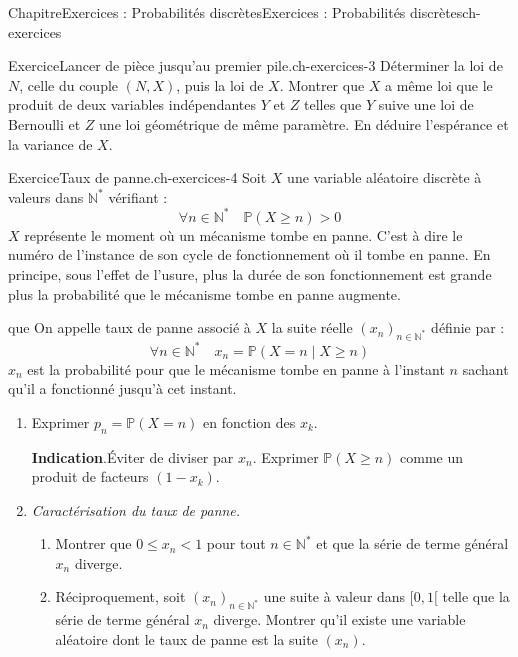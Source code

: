 \documentclass[twoside,10pt,]{book}
\newcommand{\blocktitlefont}{\relax}
\newcommand{\lititle}[1]{{\slshape#1}}
\numberwithin{equation}{chapter}
\newcommand{\N}{\mathbb N}
\renewcommand{\Pr}{\mathbb P}
\let\geq\geqslant
\newcommand{\lt}{<}
\begin{document}
\begin{chapterptx}{Chapitre}{Exercices : Probabilités discrètes}{}{Exercices : Probabilités discrètes}{}{}{ch-exercices}
\begin{inlineexercise}{Exercice}{Lancer de pièce jusqu'au premier pile.}{ch-exercices-3}
Déterminer la loi de \(N\), celle du couple \((N, X)\), puis la loi de \(X\).%
Montrer que \(X\) a même loi que le produit de deux variables indépendantes \(Y\) et \(Z\) telles que \(Y\) suive une loi de Bernoulli et \(Z\) une loi géométrique de même paramètre.%
En déduire l'espérance et la variance de \(X\).%
\end{inlineexercise}%
\begin{inlineexercise}{Exercice}{Taux de panne.}{ch-exercices-4}%
Soit \(X\) une variable aléatoire discrète à valeurs dans \(\N^{*}\) vérifiant :%
\begin{equation*}
\forall n \in \N^{*} \quad \Pr(X \geqslant n)>0
\end{equation*}
\(X\) représente le moment où un mécanisme tombe en panne. C'est à dire le numéro de l'instance de son cycle de fonctionnement où il tombe en panne. En principe, sous l'effet de l'usure, plus la durée de son fonctionnement est grande plus la probabilité que le mécanisme tombe en panne augmente.%
 \par
que On appelle taux de panne associé à \(X\) la suite réelle \(\left(x_{n}\right)_{n \in \N^{*}}\) définie par :%
\begin{equation*}
\forall n \in \N^{*} \quad x_{n}=\Pr(X=n \mid X \geqslant n)
\end{equation*}
\(x_n\) est la probabilité pour que le mécanisme tombe en panne à l'instant \(n\) sachant qu'il a fonctionné jusqu'à cet instant.%
\begin{enumerate}[font=\bfseries,label=(\alph*),ref=\alph*]%
\item{}Exprimer \(p_{n}=\Pr(X=n)\) en fonction des \(x_{k}\).%
\par\smallskip%
\noindent\textbf{\blocktitlefont Indication}.\hypertarget{ch-exercices-4-3-2}{}\quad{}Éviter de diviser par \(x_n\). Exprimer \(\Pr(X\geq n)\) comme un produit de facteurs \((1-x_k)\).%
\item{}\lititle{Caractérisation du taux de panne.}\par%
%
\begin{enumerate}[label={\arabic*.}]
\item{}Montrer que \(0 \leqslant x_{n} \lt 1\) pour tout \(n \in \N^{*}\) et que la série de terme général \(x_{n}\) diverge.%
\item{}Réciproquement, soit \(\left(x_{n}\right)_{n \in \N^{*}}\) une suite à valeur dans \([0,1[\) telle que la série de terme général \(x_{n}\) diverge. Montrer qu'il existe une variable aléatoire dont le taux de panne est la suite \(\left(x_{n}\right)\).%

\end{enumerate}
\end{enumerate}
\end{inlineexercise}
\end{chapterptx}
\end{document}
